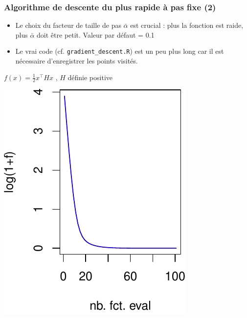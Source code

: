 \documentclass[12pt]{beamer}
\begin{document}
\begin{frame}
\frametitle{Algorithme de descente du plus rapide à pas fixe (2)} 
\begin{itemize}
\item Le choix du facteur de taille de pas $\bar\alpha$ est crucial : plus la fonction est raide, plus $\bar\alpha$ doit être petit. Valeur par défaut = 0.1
\item Le vrai code (cf. \texttt{gradient\_descent.R}) est un peu plus long car il est nécessaire d’enregistrer les points visités.
\end{itemize}
\vspace{-0.5cm}
\begin{center}
{\scriptsize $f(x) = \frac{1}{2} x^\top H x$ , $H$ définie positive}\\
\begin{minipage}[b]{0.3\textwidth}
\includegraphics[width=\textwidth]{gradient_quad_2d_f_alpha01-crop.pdf} 
\end{minipage}
\hspace{1.5cm}
\begin{minipage}[b]{0.3\textwidth}

\end{minipage}
\end{center}
\end{frame}
\end{document}
